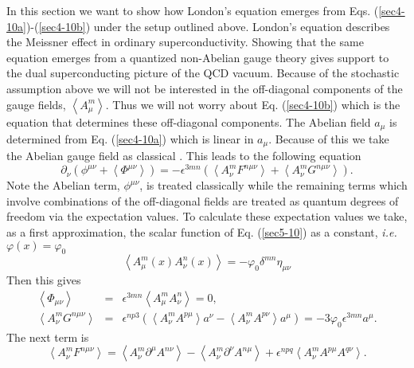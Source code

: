 \documentclass[a4paper,aps,showpacs]{revtex4}
\begin{document}
In this section we want to show how London's equation emerges
from Eqs. (\ref{sec4-10a})-(\ref{sec4-10b}) under the setup
outlined above. London's equation describes the Meissner effect in
ordinary superconductivity. Showing that the same equation
emerges from a quantized non-Abelian gauge theory gives support
to the dual superconducting picture of the QCD vacuum.
Because of the stochastic assumption above we will not be
interested in the off-diagonal components of the gauge fields,
$\left\langle A^m_\mu \right\rangle$. Thus we will not
worry about Eq. (\ref{sec4-10b}) which is the equation that
determines these off-diagonal components. The Abelian field
$a_\mu$ is determined from Eq. (\ref{sec4-10a}) which is
linear in $a_\mu$. Because of this we take the Abelian gauge field
as classical \cite{dzhsin}. This leads to the following equation
\begin{equation}
  \partial_\nu \left(
  \phi^{\mu\nu} + \left\langle \Phi ^{\mu\nu} \right\rangle
  \right) = - \epsilon^{3mn}
  \left(
  \left\langle A^m_\nu F^{n\mu\nu} \right\rangle +
  \left\langle A^m_\nu G^{n\mu\nu} \right\rangle
  \right) .
\label{sec6-10}
\end{equation}
Note the Abelian term, $\phi^{\mu\nu}$, is treated classically while
the remaining terms which involve combinations of the off-diagonal
fields are treated as quantum degrees of freedom via
the expectation values. To calculate these expectation values
we take, as a first approximation, the scalar function of Eq.
(\ref{sec5-10}) as a constant, {\it i.e.} $\varphi (x) = \varphi _0$
\begin{equation}
  \left\langle A^m_\mu (x) A^n_\nu (x) \right\rangle =
  -\varphi_0 \delta^{mn} \eta_{\mu\nu}
\label{sec6-20}
\end{equation}
Then this gives
\begin{eqnarray}
  \left\langle \Phi_{\mu\nu} \right\rangle & = &
  \epsilon^{3mn} \left\langle A^m_\mu A^n_\nu \right\rangle = 0 ,
\label{sec6-30a}\\
  \left\langle A^m_\nu G^{n\mu\nu} \right\rangle & = &
  \epsilon^{np3}
  \left(
  \left\langle A^m_\nu A^{p\mu} \right\rangle a^\nu -
  \left\langle A^m_\nu A^{p\nu} \right\rangle a^\mu
  \right) = -3 \varphi_0 \epsilon^{3mn} a^\mu .
\label{sec6-40}
\end{eqnarray}
The next term is
\begin{equation}
  \left\langle A^m_\nu F^{n\mu\nu} \right\rangle =
  \left\langle A^m_\nu \partial^\mu A^{n\nu} \right\rangle -
  \left\langle A^m_\nu \partial^\nu A^{n\mu} \right\rangle +
  \epsilon^{npq} \left\langle A^m_\nu A^{p\mu} A^{q\nu} \right\rangle .
\label{sec6-50}
\end{equation}
\end{document}
